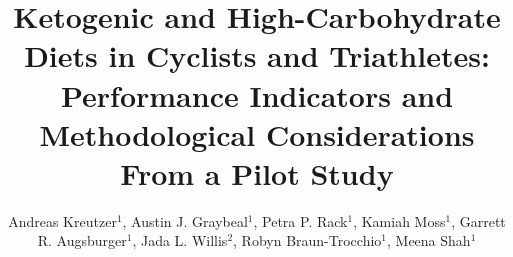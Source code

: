\documentclass[]{cik}%
\begin{document}
\title{Ketogenic and High-Carbohydrate Diets in Cyclists and
Triathletes: Performance Indicators and Methodological Considerations
From a Pilot Study}

\author{
Andreas Kreutzer$^{1}$,
Austin J. Graybeal$^{1}$,
Petra P. Rack$^{1}$,
Kamiah Moss$^{1}$,
Garrett R. Augsburger$^{1}$,
Jada L. Willis$^{2}$,
Robyn Braun-Trocchio$^{1}$,
Meena Shah$^{1}$}

\address{
  $^{1}$Department of Kinesiology, Harris College of Nursing \& Health
Sciences, Texas Christian University, Fort Worth, TX\\
  $^{2}$School of Kinesiology and Nutrition, College of Education and
Human Sciences, University of Southern Mississippi, Hattiesburg, MS\\
  $^{3}$Department of Nutritional Sciences, College of Science \&
Engineering, Texas Christian University, Fort Worth, TX}
\subject{
Physiology \& Nutrition}





\end{document}
